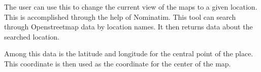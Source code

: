The user can use this to change the current view of the maps to a given location. This is accomplished through the help of Nominatim. This tool can search through Openstreetmap data by location names. It then returns data about the searched location. 

Among this data is the latitude and longitude for the central point of the place. \citep{Nominatim}
This coordinate is then used as the coordinate for the center of the map.
